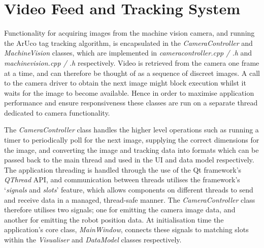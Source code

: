 
\section{Video Feed and Tracking System} \label{VideoFeedAndTrackingSystem}
Functionality for acquiring images from the machine vision camera, and running the ArUco tag tracking algorithm, is encapsulated in the \textit{CameraController} and \textit{MachineVision} classes, which are implemented in \textit{cameracontroller.cpp / .h} and \textit{machinevision.cpp / .h} respectively. Video is retrieved from the camera one frame at a time, and can therefore be thought of as a sequence of discreet images. A call to the camera driver to obtain the next image might block execution whilst it waits for the image to become available. Hence in order to maximise application performance and ensure responsiveness these classes are run on a separate thread dedicated to camera functionality. 

The \textit{CameraController} class handles the higher level operations such as running a timer to periodically poll for the next image, supplying the correct dimensions for the image, and converting the image and tracking data into formats which can be passed back to the main thread and used in the UI and data model respectively. The application threading is handled through the use of the Qt framework's \textit{QThread} API, and communication between threads utilises the framework's `\textit{signals} and \textit{slots}' feature, which allows components on different threads to send and receive data in a managed, thread-safe manner. The \textit{CameraController} class therefore utilises two signals; one for emitting the camera image data, and another for emitting the robot position data. At initialisation time the application's core class, \textit{MainWindow}, connects these signals to matching slots within the \textit{Visualiser} and \textit{DataModel} classes respectively.

